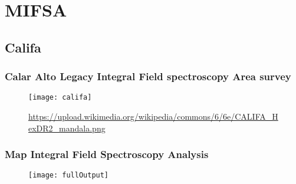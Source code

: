 \documentclass{beamer}
\begin{document}
	\section{MIFSA}
	\subsection{Califa}
	\begin{frame}
	\frametitle{Calar Alto Legacy Integral Field spectroscopy Area survey}
	\begin{figure}
	\texttt{[image: califa]}
	\caption{\tiny{\url{https://upload.wikimedia.org/wikipedia/commons/6/6e/CALIFA_HexDR2_mandala.png}}}
	\end{figure}
	\end{frame}
	\begin{frame}
	\frametitle{Map
Integral Field Spectroscopy Analysis}
\begin{figure}
\texttt{[image: fullOutput]}
\end{figure}
	\end{frame}
\end{document}
